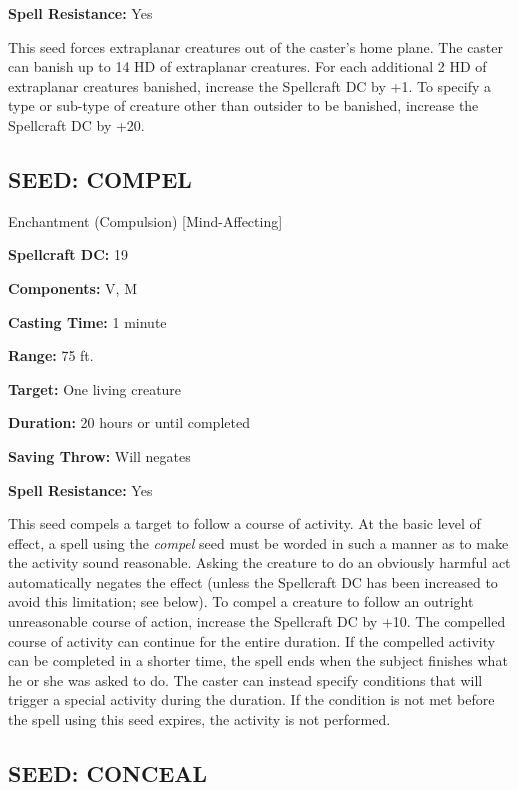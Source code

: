 \documentclass{article}
\begin{document}
\textbf{Spell Resistance:} Yes 

This seed forces extraplanar creatures out of the caster's home plane. The caster 
can banish up to 14 HD of extraplanar creatures. For each additional 2 HD of extraplanar 
creatures banished, increase the Spellcraft DC by +1. To specify a type or sub-type 
of creature other than outsider to be banished, increase the Spellcraft DC by +20. 

\vspace{12pt}
\subsection*{SEED: COMPEL }

Enchantment (Compulsion) [Mind-Affecting] 

\textbf{Spellcraft DC:} 19 

\textbf{Components:} V, M 

\textbf{Casting Time:} 1 minute 

\textbf{Range:} 75 ft. 

\textbf{Target:} One living creature 

\textbf{Duration:} 20 hours or until completed 

\textbf{Saving Throw:} Will negates 

\textbf{Spell Resistance:} Yes 

This seed compels a target to follow a course of activity. At the basic level of 
effect, a spell using the \textit{compel }seed must be worded in such a manner 
as to make the activity sound reasonable. Asking the creature to do an obviously 
harmful act automatically negates the effect (unless the Spellcraft DC has been 
increased to avoid this limitation; see below). To compel a creature to follow 
an outright unreasonable course of action, increase the Spellcraft DC by +10. The 
compelled course of activity can continue for the entire duration. If the compelled 
activity can be completed in a shorter time, the spell ends when the subject finishes 
what he or she was asked to do. The caster can instead specify conditions that 
will trigger a special activity during the duration. If the condition is not met 
before the spell using this seed expires, the activity is not performed. 

\vspace{12pt}
\subsection*{SEED: CONCEAL }
\end{document}
